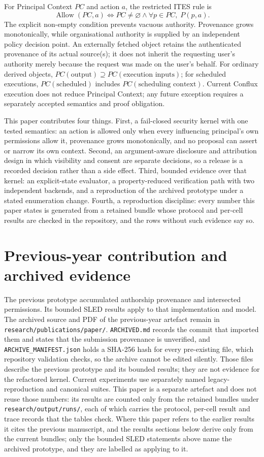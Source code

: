 \documentclass[11pt]{article}
\begin{document}
For Principal Context $PC$ and action $a$, the restricted ITES rule is
\[
  \operatorname{Allow}(PC,a) \Longleftrightarrow
  PC \neq \varnothing \land \forall p \in PC,\;P(p,a).
\]
The explicit non-empty condition prevents vacuous authority. Provenance grows
monotonically, while organisational authority is supplied by an independent
policy decision point. An externally fetched object retains the authenticated
provenance of its actual source(s); it does not inherit the requesting user's
authority merely because the request was made on the user's behalf. For
ordinary derived objects, $PC(\text{output}) \supseteq PC(\text{execution
inputs})$; for scheduled executions, $PC(\text{scheduled})$ includes
$PC(\text{scheduling context})$. Current Conflux execution does not reduce
Principal Context; any future exception requires a separately accepted
semantics and proof obligation.

This paper contributes four things. First, a fail-closed security kernel with
one tested semantics: an action is allowed only when every influencing
principal's own permissions allow it, provenance grows monotonically, and no
proposal can assert or narrow its own context. Second, an argument-aware
disclosure and attribution design in which visibility and consent are separate
decisions, so a release is a recorded decision rather than a side effect.
Third, bounded evidence over that kernel: an explicit-state evaluator, a
property-reduced verification path with two independent backends, and a
reproduction of the archived prototype under a stated enumeration change.
Fourth, a reproduction discipline: every number this paper states is generated
from a retained bundle whose protocol and per-cell results are checked in the
repository, and the rows without such evidence say so.

\section{Previous-year contribution and archived evidence}
The previous prototype accumulated authorship provenance and intersected
permissions. Its bounded SLED results apply to that implementation and model.
The archived source and PDF of the previous-year artefact remain in
\texttt{research/publications/paper/}. \texttt{ARCHIVED.md} records the commit
that imported them and states that the submission provenance is unverified, and
\texttt{ARCHIVE\_MANIFEST.json} holds a SHA-256 hash for every pre-existing
file, which repository validation checks, so the archive cannot be edited
silently. Those files describe the previous prototype and its bounded results;
they are not evidence for the refactored kernel. Current experiments use
separately named legacy-reproduction and canonical suites.
This paper is a separate artefact and does not reuse those numbers: its
results are counted only from the retained bundles under
\texttt{research/output/runs/}, each of which carries the protocol, per-cell
result and trace records that the tables check. Where this paper refers to the
earlier results it cites the previous manuscript, and the results sections
below derive only from the current bundles; only the bounded SLED statements
above name the archived prototype, and they are labelled as applying to it.
\end{document}

